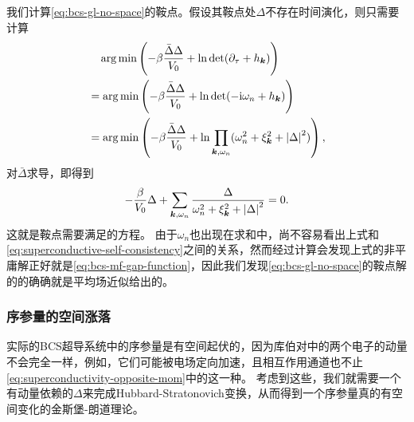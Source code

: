 我们计算\eqref{eq:bcs-gl-no-space}的鞍点。假设其鞍点处$\Delta$不存在时间演化，则只需要计算
\[
    \begin{aligned}
        &\quad \arg\min\left(- \beta \frac{\bar{\Delta} \Delta}{V_0} + \ln \det (\partial_\tau + h_{\vb*{k}})\right) \\
        &= \arg\min\left( - \beta \frac{\bar{\Delta} \Delta}{V_0} + \ln \det (- \mathrm{i} \omega_n + h_{\vb*{k}}) \right) \\
        &= \arg\min\left( - \beta \frac{\bar{\Delta} \Delta}{V_0} + \ln \prod_{\vb*{k}, \omega_n} (\omega_n^2 + \xi_{\vb*{k}}^2 + \abs{\Delta}^2) \right),
    \end{aligned}
\]
对$\bar{\Delta}$求导，即得到
\begin{equation}
    - \frac{\beta}{V_0} \Delta + \sum_{\vb*{k}, \omega_n} \frac{\Delta}{\omega_n^2 + \xi_{\vb*{k}}^2 + \abs{\Delta}^2} = 0.
\end{equation}
这就是鞍点需要满足的方程。
由于$\omega_n$也出现在求和中，尚不容易看出上式和\eqref{eq:superconductive-self-consistency}之间的关系，然而经过计算会发现上式的非平庸解正好就是\eqref{eq:bcs-mf-gap-function}，因此我们发现\eqref{eq:bcs-gl-no-space}的鞍点解的的确确就是平均场近似给出的。

\subsubsection{序参量的空间涨落}

实际的BCS超导系统中的序参量是有空间起伏的，因为库伯对中的两个电子的动量不会完全一样，例如，它们可能被电场定向加速，且相互作用通道也不止\eqref{eq:superconductivity-opposite-mom}中的这一种。
考虑到这些，我们就需要一个有动量依赖的$\Delta$来完成Hubbard-Stratonovich变换，从而得到一个序参量真的有空间变化的金斯堡-朗道理论。

